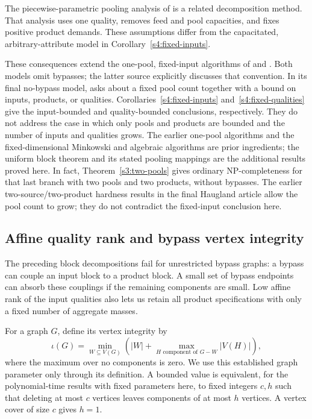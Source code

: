 The piecewise-parametric pooling analysis of
\citet[Assumption~2.2]{s3:baltean2018} is a related decomposition
method. That analysis uses one quality, removes feed and pool
capacities, and fixes positive product demands. These assumptions
differ from the capacitated, arbitrary-attribute model in
Corollary~\ref{s4:fixed-inputs}.

These consequences extend the one-pool, fixed-input algorithms of
\citet[Theorem~1]{s4:boland2017} and
\citet[Theorem~4.1]{s3:haugland-hendrix2016}. Both models omit bypasses;
the latter source explicitly discusses that convention. In its final
no-bypass model, \citet[Section~6, p.~214]
{haugland2016-the-computational-complexity-of-the} asks about a fixed
pool count together with a bound on inputs, products, or qualities.
Corollaries~\ref{s4:fixed-inputs} and~\ref{s4:fixed-qualities} give the
input-bounded and quality-bounded conclusions, respectively.
They do not address the case in which only pools and products are
bounded and the number of inputs and qualities grows. The earlier
one-pool algorithms and the fixed-dimensional Minkowski and algebraic
algorithms are prior ingredients; the uniform block theorem and its
stated pooling mappings are the additional results proved here.
In fact, Theorem~\ref{s3:two-pools} gives ordinary NP-completeness for
that last branch with two pools and two products, without bypasses.
The earlier two-source/two-product hardness results in the final
Haugland article allow the pool count to grow; they do not contradict
the fixed-input conclusion here.

\subsection{Affine quality rank and bypass vertex integrity}
\label{s4:bypass-structure}

The preceding block decompositions fail for unrestricted bypass graphs:
a bypass can couple an input block to a product block. A small set of
bypass endpoints can absorb these couplings if the remaining components
are small. Low affine rank of the input qualities also lets us retain
all product specifications with only a fixed number of aggregate masses.

For a graph $G$, define its vertex integrity by
\[
 \iota(G)=\min_{W\subseteq V(G)}
 \left(|W|+\max_{H\text{ component of }G-W}|V(H)|\right),
\]
where the maximum over no components is zero. We use this established
graph parameter only through its definition. A bounded value is
equivalent, for the polynomial-time results with fixed parameters here, to fixed integers
$c,h$ such that deleting at most $c$ vertices leaves components of at
most $h$ vertices. A vertex cover of size $c$ gives $h=1$.

